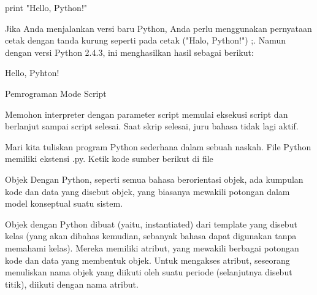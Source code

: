 {{{{{{{{{\vspace{14pt}
\noindent 
{\fontsize{14pt}{14pt}\selectfont print "Hello, Python!" \\} \par
\vspace{14pt}
\noindent 
{\fontsize{14pt}{14pt}\selectfont Jika Anda menjalankan versi baru Python, Anda perlu menggunakan pernyataan cetak dengan tanda kurung seperti pada cetak ("Halo, Python!") ;. Namun dengan versi Python 2.4.3, ini menghasilkan hasil sebagai berikut: \\} \par
\vspace{14pt}
\noindent 
{\fontsize{14pt}{14pt}\selectfont Hello, Pyhton! \\} \par
\vspace{14pt}
\noindent 
{\fontsize{14pt}{14pt}\selectfont Pemrograman Mode Script \\} \par
\noindent 
{\fontsize{14pt}{14pt}\selectfont Memohon interpreter dengan parameter script memulai eksekusi script dan berlanjut sampai script selesai. Saat skrip selesai, juru bahasa tidak lagi aktif. \\} \par
\vspace{14pt}
\noindent 
{\fontsize{14pt}{14pt}\selectfont Mari kita tuliskan program Python sederhana dalam sebuah naskah. File Python memiliki ekstensi .py. Ketik kode sumber berikut di file \\} \par
\vspace{14pt}
\noindent 
{\fontsize{14pt}{14pt}\selectfont Objek Dengan Python, seperti semua bahasa berorientasi objek, ada kumpulan kode dan data yang disebut objek, yang biasanya mewakili potongan dalam model konseptual suatu sistem. \\} \par
\vspace{14pt}
\noindent 
{\fontsize{14pt}{14pt}\selectfont Objek dengan Python dibuat (yaitu, instantiated) dari template yang disebut kelas (yang akan dibahas kemudian, sebanyak bahasa dapat digunakan tanpa memahami kelas). Mereka memiliki atribut, yang mewakili berbagai potongan kode dan data yang membentuk objek. Untuk mengakses atribut, seseorang menuliskan nama objek yang diikuti oleh suatu periode (selanjutnya disebut titik), diikuti dengan nama atribut. \\} \par
\vspace{14pt}
}}}}}}}}}
